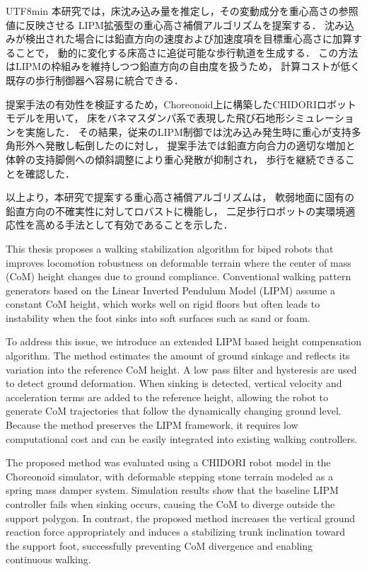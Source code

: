 \documentclass[a4paper,11pt]{report}
\begin{document}
\begin{CJK}{UTF8}{min}
本研究では，床沈み込み量を推定し，その変動成分を重心高さの参照値に反映させる
LIPM拡張型の重心高さ補償アルゴリズムを提案する．
沈み込みが検出された場合には鉛直方向の速度および加速度項を目標重心高さに加算することで，
動的に変化する床高さに追従可能な歩行軌道を生成する．
この方法はLIPMの枠組みを維持しつつ鉛直方向の自由度を扱うため，
計算コストが低く既存の歩行制御器へ容易に統合できる．

提案手法の有効性を検証するため，Choreonoid上に構築したCHIDORIロボットモデルを用いて，
床をバネマスダンパ系で表現した飛び石地形シミュレーションを実施した．
その結果，従来のLIPM制御では沈み込み発生時に重心が支持多角形外へ発散し転倒したのに対し，
提案手法では鉛直方向合力の適切な増加と体幹の支持脚側への傾斜調整により重心発散が抑制され，
歩行を継続できることを確認した．

以上より，本研究で提案する重心高さ補償アルゴリズムは，
軟弱地面に固有の鉛直方向の不確実性に対してロバストに機能し，
二足歩行ロボットの実環境適応性を高める手法として有効であることを示した．


\vspace{5mm}

This thesis proposes a walking stabilization algorithm for biped robots
that improves locomotion robustness on deformable terrain where the center of mass (CoM) height changes due to ground compliance.
Conventional walking pattern generators based on the Linear Inverted Pendulum Model (LIPM) assume a constant CoM height,
which works well on rigid floors but often leads to instability when the foot sinks into soft surfaces such as sand or foam.

To address this issue, we introduce an extended LIPM based height compensation algorithm.
The method estimates the amount of ground sinkage and reflects its variation into the reference CoM height.
A low pass filter and hysteresis are used to detect ground deformation.
When sinking is detected, vertical velocity and acceleration terms are added to the reference height,
allowing the robot to generate CoM trajectories that follow the dynamically changing ground level.
Because the method preserves the LIPM framework, it requires low computational cost
and can be easily integrated into existing walking controllers.

The proposed method was evaluated using a CHIDORI robot model in the Choreonoid simulator,
with deformable stepping stone terrain modeled as a spring mass damper system.
Simulation results show that the baseline LIPM controller fails when sinking occurs,
causing the CoM to diverge outside the support polygon.
In contrast, the proposed method increases the vertical ground reaction force appropriately
and induces a stabilizing trunk inclination toward the support foot,
successfully preventing CoM divergence and enabling continuous walking.


\end{CJK}
\end{document}
